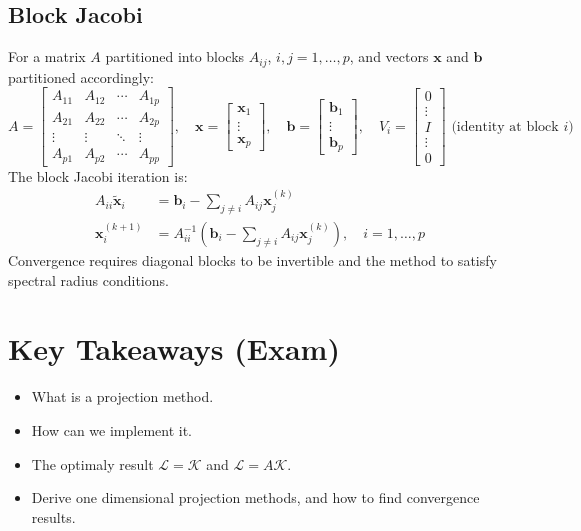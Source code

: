 \subsection*{Block Jacobi}
For a matrix $A$ partitioned into blocks $A_{ij}$, $i,j=1,\dots,p$, and vectors $\mathbf{x}$ and $\mathbf{b}$ partitioned accordingly:
\[
    A = \begin{bmatrix} A_{11} & A_{12} & \cdots & A_{1p} \\ A_{21} & A_{22} & \cdots & A_{2p} \\ \vdots & \vdots & \ddots & \vdots \\ A_{p1} & A_{p2} & \cdots & A_{pp} \end{bmatrix}, \quad \mathbf{x} = \begin{bmatrix} \mathbf{x}_1 \\ \vdots \\ \mathbf{x}_p \end{bmatrix}, \quad \mathbf{b} = \begin{bmatrix} \mathbf{b}_1 \\ \vdots \\ \mathbf{b}_p \end{bmatrix},
    \quad V_i = \begin{bmatrix} 0 \\ \vdots \\ I \\ \vdots \\ 0 \end{bmatrix} \text{ (identity at block } i\text{)}
\]
The block Jacobi iteration is:
\begin{align*}
    A_{ii} \tilde{\mathbf{x}}_i & = \mathbf{b}_i - \sum_{j \neq i} A_{ij} \mathbf{x}_j^{(k)}                                               \\
    \mathbf{x}_i^{(k+1)}        & = A_{ii}^{-1} \left( \mathbf{b}_i - \sum_{j \neq i} A_{ij} \mathbf{x}_j^{(k)} \right), \quad i=1,\dots,p
\end{align*}
Convergence requires diagonal blocks to be invertible and the method to satisfy spectral radius conditions.


\section*{Key Takeaways (Exam)}
\begin{itemize}
    \item What is a projection method.
    \item How can we implement it.
    \item The optimaly result $\mathcal{L} = \mathcal{K}$ and $\mathcal{L} = A\mathcal{K}$.
    \item Derive one dimensional projection methods, and how to find convergence results.
\end{itemize}